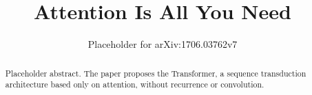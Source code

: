 \documentclass[11pt]{article}
\title{Attention Is All You Need}
\author{Placeholder for arXiv:1706.03762v7}
\date{}
\begin{document}
\maketitle

\begin{abstract}
Placeholder abstract. The paper proposes the Transformer, a sequence transduction architecture based only on attention, without recurrence or convolution.
\end{abstract}




\end{document}
